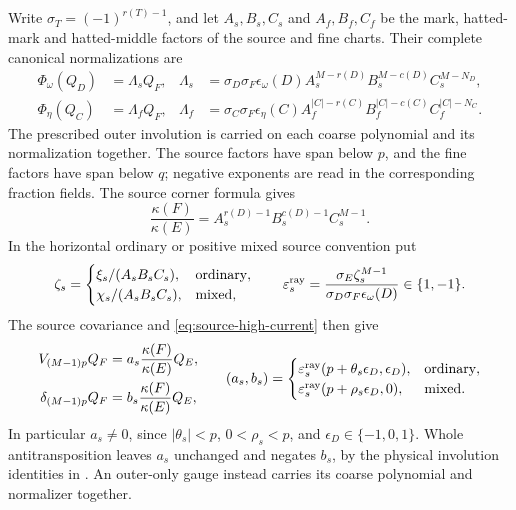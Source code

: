 \documentclass[11pt,a4paper]{amsart}
\numberwithin{equation}{section}
\theoremstyle{plain}
\theoremstyle{definition}
\newcommand{\eps}{\varepsilon}
\begin{document}
Write \(\sigma_T=(-1)^{r(T)-1}\), and let
\(A_s,B_s,C_s\) and \(A_f,B_f,C_f\) be the mark, hatted-mark and
hatted-middle factors of the source and fine charts.  Their complete
canonical normalizations are
\[
 \begin{aligned}
 \Phi_\omega(Q_D)&=\Lambda_sQ_F,&
 \Lambda_s&=\sigma_D\sigma_F\epsilon_\omega(D)
 A_s^{M-r(D)}B_s^{M-c(D)}C_s^{M-N_D},\\
 \Phi_\eta(Q_C)&=\Lambda_fQ_F,&
 \Lambda_f&=\sigma_C\sigma_F\epsilon_\eta(C)
 A_f^{|C|-r(C)}B_f^{|C|-c(C)}C_f^{|C|-N_C}.
 \end{aligned}
\]
The prescribed outer involution is carried on each coarse polynomial
and its normalization together.  The source factors have span below
\(p\), and the fine factors have span below \(q\); negative exponents
are read in the corresponding fraction fields.
The source corner formula gives
\[
 \frac{\kappa(F)}{\kappa(E)}
 =A_s^{r(D)-1}B_s^{c(D)-1}C_s^{M-1}.
\]
In the horizontal ordinary or positive mixed source convention put
\[
 \zeta_s=
 \begin{cases}
 \xi_s/(A_sB_sC_s),&\text{ordinary},\\
 \chi_s/(A_sB_sC_s),&\text{mixed},
 \end{cases}
 \qquad
 \eps_s^{\rm ray}
 =\frac{\sigma_E\zeta_s^{M-1}}
        {\sigma_D\sigma_F\epsilon_\omega(D)}\in\{1,-1\}.
\]
The source covariance and \eqref{eq:source-high-current} then give
\[
 \begin{aligned}
 V_{(M-1)p}Q_F
   &=a_s\frac{\kappa(F)}{\kappa(E)}Q_E,\\
 \delta_{(M-1)p}Q_F
   &=b_s\frac{\kappa(F)}{\kappa(E)}Q_E,
 \end{aligned}
 \qquad
 (a_s,b_s)=
 \begin{cases}
 \eps_s^{\rm ray}(p+\theta_s\epsilon_D,\epsilon_D),
      &\text{ordinary},\\
 \eps_s^{\rm ray}(p+\rho_s\epsilon_D,0),
      &\text{mixed}.
 \end{cases}
\]
In particular \(a_s\ne0\), since \(|\theta_s|<p\),
\(0<\rho_s<p\), and \(\epsilon_D\in\{-1,0,1\}\).
Whole antitransposition leaves \(a_s\) unchanged and negates \(b_s\),
by the physical involution identities in \cite[Composition covariance]{Shields2026Readout}.
An outer-only gauge instead carries its coarse polynomial and
normalizer together.
\end{document}
